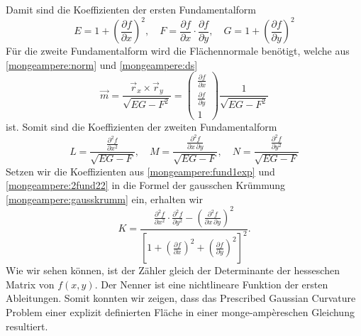 Damit sind die Koeffizienten der ersten Fundamentalform 
\begin{equation}
  E = 1 + \left(\frac{\partial f}{\partial x}\right)^2, \quad
  F = \frac{\partial f}{\partial x} \cdot \frac{\partial f}{\partial y}, \quad
  G = 1 + \left(\frac{\partial f}{\partial y}\right)^2
  \label{mongeampere:fund1exp}
\end{equation}
Für die zweite Fundamentalform wird die Flächennormale benötigt, welche aus \eqref{mongeampere:norm} und \eqref{mongeampere:ds} 
\begin{equation}
  \vec m = \frac{\vec r_x \times \vec r_y}{\sqrt{EG-F^2}} = \begin{pmatrix}
    \frac{\partial f}{\partial x} \\
    \frac{\partial f}{\partial y} \\
    1
  \end{pmatrix}
  \frac{1}{\sqrt{EG-F^2}}
  \label{mongeampere:norm2}
\end{equation}
ist.
Somit sind die Koeffizienten der zweiten Fundamentalform
\begin{equation}
  L = \frac{\frac{\partial^2 f}{\partial x^2}}{\sqrt{EG-F}}, \quad
  M = \frac{\frac{\partial^2 f}{\partial x \, \partial y}}{\sqrt{EG-F}}, \quad
  N = \frac{\frac{\partial^2 f}{\partial y^2}}{\sqrt{EG-F}}
  \label{mongeampere:2fund22}
\end{equation}
Setzen wir die Koeffizienten aus \eqref{mongeampere:fund1exp} und \eqref{mongeampere:2fund22} in die Formel der gausschen Krümmung \eqref{mongeampere:gausskrumm}
ein, erhalten wir
\begin{equation}
  K = \frac{
    \frac{\partial^2 f}{\partial x^2} \cdot \frac{\partial^2 f}{\partial y^2} - \left(\frac{\partial^2 f}{\partial x \, \partial y} \right)^2}
    {\left[1 + 
    \left(\frac{\partial f}{\partial x}\right)^2 +
    \left(\frac{\partial f}{\partial y}\right)^2\right]^2}.
  \label{mongeampere:pd}
\end{equation}
Wie wir sehen können, ist der Zähler gleich der Determinante der hesseschen Matrix von $f(x,y)$.
Der Nenner ist eine nichtlineare Funktion der ersten Ableitungen.
Somit konnten wir zeigen, dass das Prescribed Gaussian Curvature Problem einer explizit definierten Fläche in einer 
monge-ampèreschen Gleichung resultiert.

